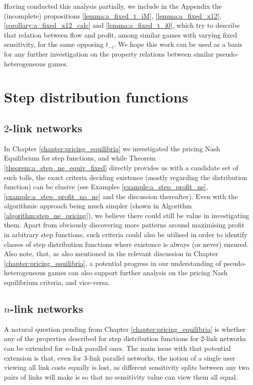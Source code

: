 \documentclass[10pt,a4paper]{book}
\theoremstyle{definition}
\theoremstyle{comment}
\begin{document}
Having conducted this analysis partially, we include in the Appendix the (incomplete) propositions \ref{lemma:a_fixed_t_iM}, \ref{lemma:a_fixed_x12}, \ref{corollary:a_fixed_x12_calc} and \ref{lemma:a_fixed_t_i0}, which try to describe that relation between flow and profit, among similar games with varying fixed sensitivity, for the same opposing $t_{-i}$.
We hope this work can be used as a basis for any further investigation on the property relations between similar pseudo-heterogeneous games.

\section*{Step distribution functions}

\subsection*{$2$-link networks}

In Chapter \ref{chapter:pricing_equilibria} we investigated the pricing Nash Equilibrium for step functions, and while Theorem \ref{theorem:a_step_ne_equiv_fixed} directly provides us with a candidate set of such tolls, the exact criteria deciding existence (mostly regarding the distribution function) can be elusive (see Examples \ref{example:a_step_profit_ne}, \ref{example:a_step_profit_no_ne} and the discussion thereafter).
Even with the algorithmic approach being much simpler (shown in Algorithm \ref{algorithm:step_ne_pricing}), we believe there could still be value in investigating them.
Apart from obviously discovering more patterns around maximising profit in arbitrary step functions, such criteria could also be utilised in order to identify classes of step distribution functions where existence is always (or never) ensured.
Also note, that, as also mentioned in the relevant discussion in Chapter \ref{chapter:pricing_equilibria}, a potential progress in our understanding of pseudo-heterogeneous games can also support further analysis on the pricing Nash equilibrium criteria, and vice-versa.

\subsection*{$n$-link networks}

A natural question pending from Chapter \ref{chapter:pricing_equilibria} is whether any of the properties described for step distribution functions for $2$-link networks can be extended for $n$-link parallel ones.
The main issue with that potential extension is that, even for $3$-link parallel networks, the notion of a single user viewing all link costs equally is lost, as different sensitivity splits between any two pairs of links will make is so that no sensitivity value can view them all equal.
\end{document}
